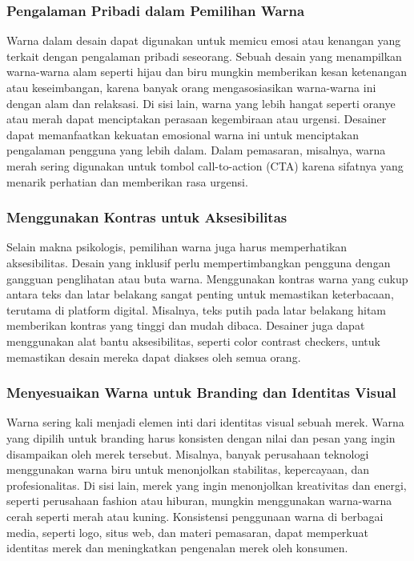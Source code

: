 \documentclass[a4paper]{article}
\begin{document}
\subsubsection{Pengalaman Pribadi dalam Pemilihan Warna}
Warna dalam desain dapat digunakan untuk memicu emosi atau kenangan yang terkait dengan pengalaman pribadi seseorang. Sebuah desain yang menampilkan warna-warna alam seperti hijau dan biru mungkin memberikan kesan ketenangan atau keseimbangan, karena banyak orang mengasosiasikan warna-warna ini dengan alam dan relaksasi. Di sisi lain, warna yang lebih hangat seperti oranye atau merah dapat menciptakan perasaan kegembiraan atau urgensi. Desainer dapat memanfaatkan kekuatan emosional warna ini untuk menciptakan pengalaman pengguna yang lebih dalam. Dalam pemasaran, misalnya, warna merah sering digunakan untuk tombol call-to-action (CTA) karena sifatnya yang menarik perhatian dan memberikan rasa urgensi.


\subsubsection{Menggunakan Kontras untuk Aksesibilitas}
Selain makna psikologis, pemilihan warna juga harus memperhatikan aksesibilitas. Desain yang inklusif perlu mempertimbangkan pengguna dengan gangguan penglihatan atau buta warna. Menggunakan kontras warna yang cukup antara teks dan latar belakang sangat penting untuk memastikan keterbacaan, terutama di platform digital. Misalnya, teks putih pada latar belakang hitam memberikan kontras yang tinggi dan mudah dibaca. Desainer juga dapat menggunakan alat bantu aksesibilitas, seperti color contrast checkers, untuk memastikan desain mereka dapat diakses oleh semua orang.


\subsubsection{Menyesuaikan Warna untuk Branding dan Identitas Visual}
Warna sering kali menjadi elemen inti dari identitas visual sebuah merek. Warna yang dipilih untuk branding harus konsisten dengan nilai dan pesan yang ingin disampaikan oleh merek tersebut. Misalnya, banyak perusahaan teknologi menggunakan warna biru untuk menonjolkan stabilitas, kepercayaan, dan profesionalitas. Di sisi lain, merek yang ingin menonjolkan kreativitas dan energi, seperti perusahaan fashion atau hiburan, mungkin menggunakan warna-warna cerah seperti merah atau kuning. Konsistensi penggunaan warna di berbagai media, seperti logo, situs web, dan materi pemasaran, dapat memperkuat identitas merek dan meningkatkan pengenalan merek oleh konsumen.
\end{document}
